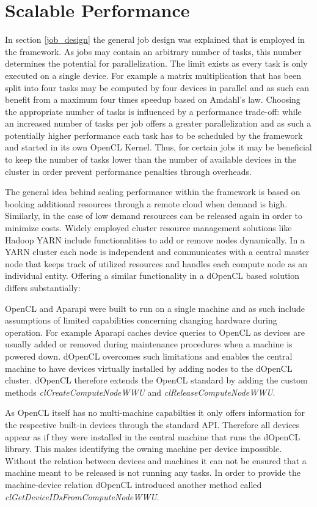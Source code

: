 \section{Scalable Performance}

In section \ref{job_design} the general job design was explained that is employed in the framework. As jobs may contain an arbitrary number of tasks, this number determines the potential for parallelization. The limit exists as every task is only executed on a single device. For example a matrix multiplication that has been split into four tasks may be computed by four devices in parallel and as such can benefit from a maximum four times speedup based on Amdahl's law. Choosing the appropriate number of tasks is influenced by a performance trade-off: while an increased number of tasks per job offers a greater parallelization and as such a potentially higher performance each task has to be scheduled by the framework and started in its own OpenCL Kernel. Thus, for certain jobs it may be beneficial to keep the number of tasks lower than the number of available devices in the cluster in order prevent performance penalties through overheads.

The general idea behind scaling performance within the framework is based on booking additional resources through a remote cloud when demand is high. Similarly, in the case of low demand resources can be released again in order to minimize costs. Widely employed cluster resource management solutions like Hadoop YARN include functionalities to add or remove nodes dynamically. In a YARN cluster each node is independent and communicates with a central master node that keeps track of utilized resources and handles each compute node as an individual entity. Offering a similar functionality in a dOpenCL based solution differs substantially:

OpenCL and Aparapi were built to run on a single machine and as such include assumptions of limited capabilities concerning changing hardware during operation. For example Aparapi caches device queries to OpenCL as devices are usually added or removed during maintenance procedures when a machine is powered down. dOpenCL overcomes such limitations and enables the central machine to have devices virtually installed by adding nodes to the dOpenCL cluster. dOpenCL therefore extends the OpenCL standard by adding the custom methods \textit{clCreateComputeNodeWWU} and \textit{clReleaseComputeNodeWWU}. 

As OpenCL itself has no multi-machine capabilties it only offers information for the respective built-in devices through the standard API. Therefore all devices appear as if they were installed in the central machine that runs the dOpenCL library. This makes identifying the owning machine per device impossible. Without the relation between devices and machines it can not be ensured that a machine meant to be released is not running any tasks. In order to provide the machine-device relation dOpenCL introduced another method called \textit{clGetDeviceIDsFromComputeNodeWWU}.

